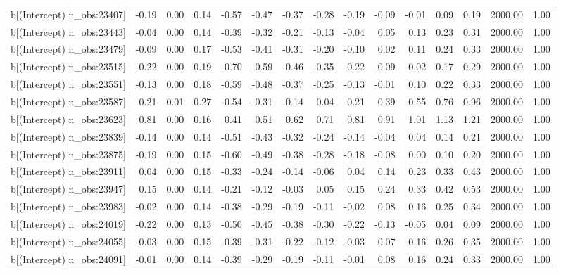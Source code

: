 \begin{table}[ht]
\begin{tabular}{rrrrrrrrrrrrrrr}
  b[(Intercept) n\_obs:23407] & -0.19 & 0.00 & 0.14 & -0.57 & -0.47 & -0.37 & -0.28 & -0.19 & -0.09 & -0.01 & 0.09 & 0.19 & 2000.00 & 1.00 \\ 
  b[(Intercept) n\_obs:23443] & -0.04 & 0.00 & 0.14 & -0.39 & -0.32 & -0.21 & -0.13 & -0.04 & 0.05 & 0.13 & 0.23 & 0.31 & 2000.00 & 1.00 \\ 
  b[(Intercept) n\_obs:23479] & -0.09 & 0.00 & 0.17 & -0.53 & -0.41 & -0.31 & -0.20 & -0.10 & 0.02 & 0.11 & 0.24 & 0.33 & 2000.00 & 1.00 \\ 
  b[(Intercept) n\_obs:23515] & -0.22 & 0.00 & 0.19 & -0.70 & -0.59 & -0.46 & -0.35 & -0.22 & -0.09 & 0.02 & 0.17 & 0.29 & 2000.00 & 1.00 \\ 
  b[(Intercept) n\_obs:23551] & -0.13 & 0.00 & 0.18 & -0.59 & -0.48 & -0.37 & -0.25 & -0.13 & -0.01 & 0.10 & 0.22 & 0.33 & 2000.00 & 1.00 \\ 
  b[(Intercept) n\_obs:23587] & 0.21 & 0.01 & 0.27 & -0.54 & -0.31 & -0.14 & 0.04 & 0.21 & 0.39 & 0.55 & 0.76 & 0.96 & 2000.00 & 1.00 \\ 
  b[(Intercept) n\_obs:23623] & 0.81 & 0.00 & 0.16 & 0.41 & 0.51 & 0.62 & 0.71 & 0.81 & 0.91 & 1.01 & 1.13 & 1.21 & 2000.00 & 1.00 \\ 
  b[(Intercept) n\_obs:23839] & -0.14 & 0.00 & 0.14 & -0.51 & -0.43 & -0.32 & -0.24 & -0.14 & -0.04 & 0.04 & 0.14 & 0.21 & 2000.00 & 1.00 \\ 
  b[(Intercept) n\_obs:23875] & -0.19 & 0.00 & 0.15 & -0.60 & -0.49 & -0.38 & -0.28 & -0.18 & -0.08 & 0.00 & 0.10 & 0.20 & 2000.00 & 1.00 \\ 
  b[(Intercept) n\_obs:23911] & 0.04 & 0.00 & 0.15 & -0.33 & -0.24 & -0.14 & -0.06 & 0.04 & 0.14 & 0.23 & 0.33 & 0.43 & 2000.00 & 1.00 \\ 
  b[(Intercept) n\_obs:23947] & 0.15 & 0.00 & 0.14 & -0.21 & -0.12 & -0.03 & 0.05 & 0.15 & 0.24 & 0.33 & 0.42 & 0.53 & 2000.00 & 1.00 \\ 
  b[(Intercept) n\_obs:23983] & -0.02 & 0.00 & 0.14 & -0.38 & -0.29 & -0.19 & -0.11 & -0.02 & 0.08 & 0.16 & 0.25 & 0.34 & 2000.00 & 1.00 \\ 
  b[(Intercept) n\_obs:24019] & -0.22 & 0.00 & 0.13 & -0.50 & -0.45 & -0.38 & -0.30 & -0.22 & -0.13 & -0.05 & 0.04 & 0.09 & 2000.00 & 1.00 \\ 
  b[(Intercept) n\_obs:24055] & -0.03 & 0.00 & 0.15 & -0.39 & -0.31 & -0.22 & -0.12 & -0.03 & 0.07 & 0.16 & 0.26 & 0.35 & 2000.00 & 1.00 \\ 
  b[(Intercept) n\_obs:24091] & -0.01 & 0.00 & 0.14 & -0.39 & -0.29 & -0.19 & -0.11 & -0.01 & 0.08 & 0.16 & 0.24 & 0.33 & 2000.00 & 1.00 \\ 

\end{tabular}
\end{table}
